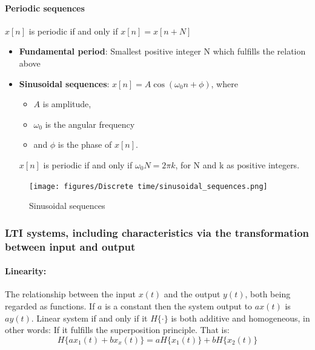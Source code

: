 \documentclass{article}
\begin{document}
\paragraph{Periodic sequences} 
$x[n]$ is periodic if and only if $x[n] = x[n+N]$
\begin{itemize}
    \item \textbf{Fundamental period}: 
    \newline Smallest positive integer N which fulfills the relation above
    \item \textbf{Sinusoidal sequences}: 
    \newline $x[n] = A\cos(\omega_0n + \phi)$, where 
    \begin{itemize}
        \item $A$ is amplitude,
        \item $\omega_0$ is the angular frequency
        \item and $\phi$ is the phase of $x[n]$.
    \end{itemize} 
    $x[n]$ is periodic if and only if $\omega_0N = 2\pi k$, for N and k as positive integers.
\end{itemize}

\begin{figure}[h!]
    \centering
    \texttt{[image: figures/Discrete time/sinusoidal\_sequences.png]}
    \caption{Sinusoidal sequences}
    \label{fig:Sinusoidal_sequence}
\end{figure}

\subsubsection{LTI systems, including characteristics via the transformation between input and output}
\paragraph{Linearity:} The relationship between the input $x(t)$ and the output $y(t)$, both being regarded as functions. If $a$ is a constant then the system output to $ax(t)$ is $ay(t)$. Linear system if and only if it $H\{\cdot\}$ is both additive and homogeneous, in other words: If it fulfills the superposition principle. That is:
\begin{equation}
    H\{ax_1(t)+bx_x(t)\} = aH\{x_1(t)\} + bH\{x_2(t)\}
\end{equation}
\end{document}
